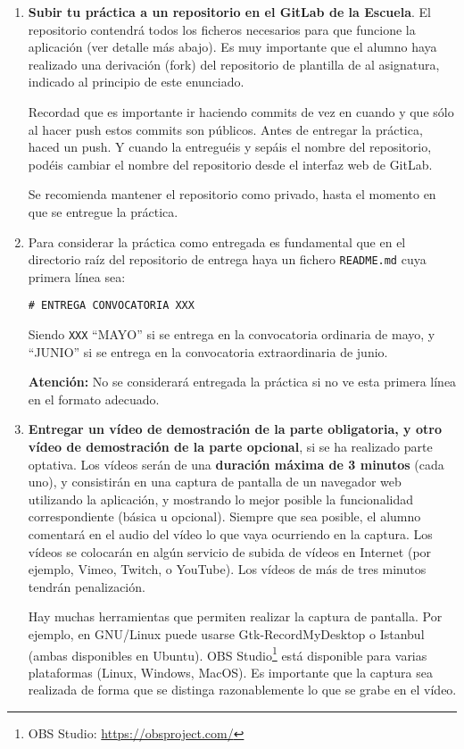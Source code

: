 \begin{enumerate}
  
  \item {\bf Subir tu práctica a un repositorio en el GitLab de la Escuela}. El repositorio contendrá todos los ficheros necesarios para que funcione la aplicación (ver detalle más abajo). Es muy importante que el alumno haya realizado una derivación (fork) del repositorio de plantilla de al asignatura, indicado al principio de este enunciado.

Recordad que es importante ir haciendo commits de vez en cuando y que sólo al hacer push estos commits son públicos. Antes de entregar la práctica, haced un push. Y cuando la entreguéis y sepáis el nombre del repositorio, podéis cambiar el nombre del repositorio desde el interfaz web de GitLab. 

Se recomienda mantener el repositorio como privado, hasta el momento en que se entregue la práctica.

\item Para considerar la práctica como entregada es fundamental que en el directorio raíz del repositorio de entrega haya un fichero \texttt{README.md} cuya primera línea sea:

\begin{verbatim}
# ENTREGA CONVOCATORIA XXX
\end{verbatim}

Siendo \texttt{XXX} ``MAYO'' si se entrega en la convocatoria ordinaria de mayo, y ``JUNIO'' si se entrega en la convocatoria extraordinaria de junio.

\textbf{Atención:} No se considerará entregada la práctica si no ve esta primera línea en el formato adecuado.

 \item {\bf Entregar un vídeo de demostración de la parte obligatoria, y otro vídeo de demostración de la parte opcional}, si se ha realizado parte optativa. Los vídeos serán de una {\bf duración máxima de 3 minutos} (cada uno), y consistirán en una captura de pantalla de un navegador web utilizando la aplicación, y mostrando lo mejor posible la funcionalidad correspondiente (básica u opcional). Siempre que sea posible, el alumno comentará en el audio del vídeo lo que vaya ocurriendo en la captura. Los vídeos se colocarán en algún servicio de subida de vídeos en Internet (por ejemplo, Vimeo, Twitch, o YouTube). Los vídeos de más de tres minutos tendrán penalización.

Hay muchas herramientas que permiten realizar la captura de pantalla. Por ejemplo, en GNU/Linux puede usarse Gtk-RecordMyDesktop o Istanbul (ambas disponibles en Ubuntu). OBS Studio\footnote{OBS Studio: \url{https://obsproject.com/}} está disponible para varias plataformas (Linux, Windows, MacOS). Es importante que la captura sea realizada de forma que se distinga razonablemente lo que se grabe en el vídeo.


\end{enumerate}
